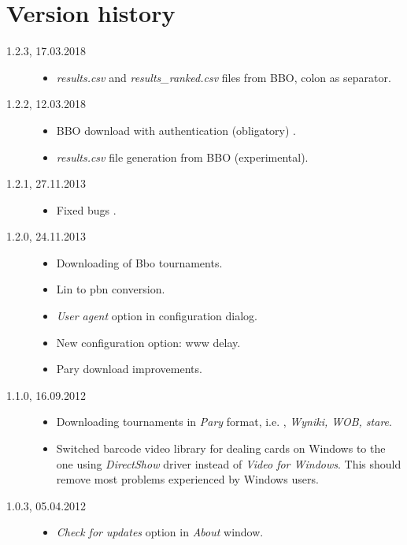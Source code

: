 \documentclass[polish,a4paper,11pt,oneside]{article}
\begin{document}
\section{Version history}
\begin{description}
\item[1.2.3, 17.03.2018]
  \begin{itemize}
  \item {\em results.csv} and {\em results\_ranked.csv} files from BBO,
        colon as separator.
  \end{itemize}
\item[1.2.2, 12.03.2018]
  \begin{itemize}
  \item BBO download with authentication (obligatory) .
  \item {\em results.csv} file generation from BBO (experimental).
  \end{itemize}
\item[1.2.1, 27.11.2013]
  \begin{itemize}
  \item Fixed bugs \bugsonetwozero.
  \end{itemize}
\item[1.2.0, 24.11.2013]
  \begin{itemize}
  \item Downloading of Bbo tournaments.
  \item Lin to pbn conversion.
  \item {\em User agent} option in configuration dialog.
  \item New configuration option: www delay.
  \item Pary download improvements.
  \end{itemize}
\item[1.1.0, 16.09.2012]
  \begin{itemize}
  \item Downloading tournaments in {\em Pary} format,
        i.e. 
        , {\em Wyniki, WOB, stare}.
  \item Switched barcode video library for dealing cards on Windows
        to the one using
        {\em DirectShow} driver instead of
        {\em Video for Windows}. This should remove most problems
        experienced by Windows users.
  \end{itemize}
\item[1.0.3, 05.04.2012]
  \begin{itemize}
  \item {\em Check for updates} option in {\em About} window.

\end{itemize}
\end{description}
\end{document}
